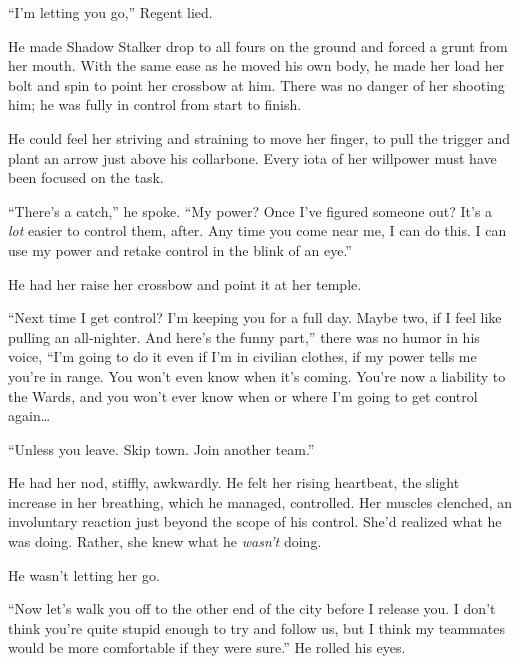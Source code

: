 





``I'm letting you go,'' Regent lied.



He made Shadow Stalker drop to all fours on the ground and forced a grunt from her mouth.  With the same ease as he moved his own body, he made her load her bolt and spin to point her crossbow at him.  There was no danger of her shooting him; he was fully in control from start to finish.



He could feel her striving and straining to move her finger, to pull the trigger and plant an arrow just above his collarbone.  Every iota of her willpower must have been focused on the task.



``There's a catch,'' he spoke. ``My power?  Once I've figured someone out?  It's a \emph{lot} easier to control them, after.  Any time you come near me, I can do this.  I can use my power and retake control in the blink of an eye.''



He had her raise her crossbow and point it at her temple.



``Next time I get control?  I'm keeping you for a full day.  Maybe two, if I feel like pulling an all-nighter.  And here's the funny part,'' there was no humor in his voice, ``I'm going to do it even if I'm in civilian clothes, if my power tells me you're in range.  You won't even know when it's coming.  You're now a liability to the Wards, and you won't ever know when or where I'm going to get control again\ldots



``Unless you leave.  Skip town.  Join another team.''



He had her nod, stiffly, awkwardly.  He felt her rising heartbeat, the slight increase in her breathing, which he managed, controlled.  Her muscles clenched, an involuntary reaction just beyond the scope of his control.  She'd realized what he was doing.  Rather, she knew what he \emph{wasn't} doing.



He wasn't letting her go.



``Now let's walk you off to the other end of the city before I release you.  I don't think you're quite stupid enough to try and follow us, but I think my teammates would be more comfortable if they were sure.''  He rolled his eyes.



